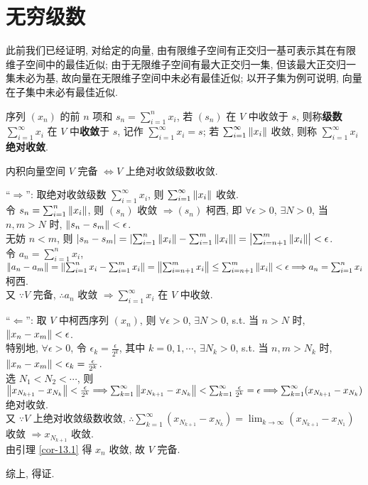 \documentclass{note}
\begin{document}
\section{无穷级数}
此前我们已经证明, 对给定的向量, 由有限维子空间有正交归一基可表示其在有限维子空间中的最佳近似; 由于无限维子空间有最大正交归一集, 但该最大正交归一集未必为基, 故向量在无限维子空间中未必有最佳近似; 以开子集为例可说明, 向量在子集中未必有最佳近似.

\begin{df}[级数收敛和绝对收敛]
    序列 $(x_n)$ 的前 $n$ 项和 $s_n=\sum_{i=1}^nx_i$, 若 $(s_n)$ 在 $V$ 中收敛于 $s$, 则称\textbf{级数} $\sum_{i=1}^{\infty}x_i$ 在 $V$ 中\textbf{收敛}于 $s$, 记作 $\sum_{i=1}^{\infty}x_i=s$; 若 $\sum_{i=1}^{\infty}\left\lVert x_i\right\rVert$ 收敛, 则称 $\sum_{i=1}^{\infty}x_i$ \textbf{绝对收敛}.
\end{df}

\begin{thm}
    内积向量空间 $V$ 完备 $\Longleftrightarrow V$ 上绝对收敛级数收敛.
\end{thm}
\begin{pf}
    ``$\Longrightarrow$'': 取绝对收敛级数 $\sum_{i=1}^{\infty}x_i$, 则 $\sum_{i=1}^{\infty}\left\lVert x_i\right\rVert$ 收敛.\\
    令 $s_n=\sum_{i=1}^n\left\lVert x_i\right\rVert$, 则 $(s_n)$ 收敛 $\Longrightarrow(s_n)$ 柯西, 即 $\forall\epsilon>0$, $\exists N>0$, 当 $n,m>N$ 时, $\left\lVert s_n-s_m\right\rVert<\epsilon$.\\
    无妨 $n<m$, 则 $\left\lvert s_n-s_m\right\rvert=\left\lvert\sum_{i=1}^n\left\lVert x_i\right\rVert-\sum_{i=1}^m\left\lVert x_i\right\rVert\right\rvert=\left\lvert\sum_{i=n+1}^m\left\lVert x_i\right\rVert\right\rvert<\epsilon$.\\
    令 $a_n=\sum_{i=1}^nx_i$, $\left\lVert a_n-a_m\right\rVert=\left\lVert\sum_{i=1}^nx_i-\sum_{i=1}^mx_i\right\rVert=\left\lVert\sum_{i=n+1}^mx_i\right\rVert\leq\sum_{i=n+1}^m\left\lVert x_i\right\rVert<\epsilon\Longrightarrow a_n=\sum_{i=1}^nx_i$ 柯西.\\
    又 $\because V$ 完备, $\therefore a_n$ 收敛 $\Longrightarrow\sum_{i=1}^{\infty}x_i$ 在 $V$ 中收敛.

    ``$\Longleftarrow$'': 取 $V$ 中柯西序列 $(x_n)$, 则 $\forall\epsilon>0$, $\exists N>0$, s.t. 当 $n>N$ 时, $\left\lVert x_n-x_m\right\rVert<\epsilon$.\\
    特别地, $\forall\epsilon>0$, 令 $\epsilon_k=\frac{\epsilon}{2^k}$, 其中 $k=0,1,\cdots$, $\exists N_k>0$, s.t. 当 $n,m>N_k$ 时, $\left\lVert x_n-x_m\right\rVert<\epsilon_k=\frac{\epsilon}{2^k}$.\\
    选 $N_1<N_2<\cdots$, 则 $\left\lVert x_{N_{k+1}}-x_{N_k}\right\rVert<\frac{\epsilon}{2^k}\Longrightarrow\sum_{k=1}^{\infty}\left\lVert x_{N_{k+1}}-x_{N_k}\right\rVert<\sum_{k=1}^{\infty}\frac{\epsilon}{2^k}=\epsilon\Longrightarrow\sum_{k=1}^{\infty}(x_{N_{k+1}}-x_{N_k})$ 绝对收敛.\\
    又 $\because V$ 上绝对收敛级数收敛, $\therefore\sum_{k=1}^{\infty}(x_{N_{k+1}}-x_{N_k})=\lim_{k\rightarrow\infty}(x_{N_{k+1}}-x_{N_1})$ 收敛 $\Longrightarrow x_{N_{k+1}}$ 收敛.\\
    由引理 \ref{cor-13.1} 得 $x_n$ 收敛, 故 $V$ 完备.

    综上, 得证.
\end{pf}
\end{document}
